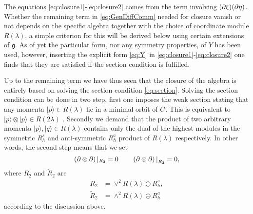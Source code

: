 The equations \eqref{eq:closure1}-\eqref{eq:closure2} comes from the term involving $(\partial\xi)(\partial\eta)$. Whether the remaining term in \eqref{eq:GenDiffComm} needed for closure vanish or not depends on the specific algebra together with the choice of coordinate module $R(\lambda)$, a simple criterion for this will be derived below using certain extensions of $\mathfrak{g}$. As of yet the particular form, nor any symmetry properties, of $Y$ has been used, however, inserting the explicit form \eqref{eq:Y} in \eqref{eq:closure1}-\eqref{eq:closure2} one finds that they are satisfied if the section condition is fulfilled. 

Up to the remaining term we have thus seen that the closure of the algebra is entirely based on solving the section condition \eqref{eq:section}. Solving the section condition can be done in two step, first one imposes the weak section stating that any momenta $|p\rangle\in \overbar{R(\lambda)}$ lie in a minimal orbit of $G$. This is equivalent to $|p\rangle\otimes|p\rangle \in \overbar{R(2\lambda)}$ \cite{Berman2013,Bossard2017}. Secondly we demand that the product of two arbitrary momenta $|p\rangle,|q\rangle\in\overbar{R(\lambda)}$ contains only the dual of the highest modules in the symmetric $R^s_h$ and anti-symmetric $R^a_h$ product of $R(\lambda)$ respectively. In other words, the second step means that we set 
\begin{equation}
    \left(\partial\otimes\partial\right)|_{R_2} = 0 \qquad \left(\partial\otimes\partial\right)|_{\tilde{R}_2} =0,
\end{equation}
where $R_2$ and $\tilde{R}_2$ are
\begin{align}
    R_2 &= \vee^2 R(\lambda)\ominus R_h^s,\\
    \tilde{R}_2 &= \wedge^2R(\lambda)\ominus  R_h^a
\end{align}
according to the discussion above. 